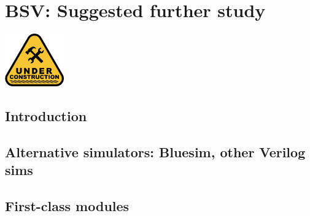 

\chapter{BSV: Suggested further study}


\setcounter{page}{1}
\renewcommand{\thepage}{\arabic{chapter}-\arabic{page}}

\label{ch_BSV_further_study}


\vspace{2ex}

\centerline{\includegraphics[width=1in,angle=0]{Figures/Fig_Under_Construction}}

\vspace{2ex}


\section{Introduction}


\section{Alternative simulators: Bluesim, other Verilog sims}


\section{First-class modules}


